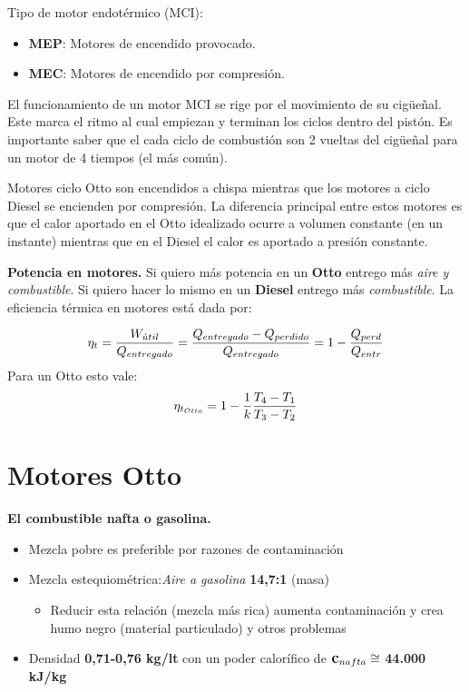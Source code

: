 Tipo de motor endotérmico (MCI):
\begin{itemize}
    \item \textbf{MEP}: Motores de encendido provocado.
    \item \textbf{MEC}: Motores de encendido por compresión.
\end{itemize}

El funcionamiento de un motor MCI se rige por el movimiento de su cigüeñal. Este marca el ritmo al cual empiezan y terminan los ciclos dentro del pistón. Es importante saber que el cada ciclo de combustión son 2 vueltas del cigüeñal para un motor de 4 tiempos (el más común). 

Motores ciclo Otto son encendidos a chispa mientras que los motores a ciclo Diesel se encienden por compresión. La diferencia principal entre estos motores es que el calor aportado en el Otto idealizado ocurre a volumen constante (en un instante) mientras que en el Diesel el calor es aportado a presión constante. 

{\bf Potencia en motores.} Si quiero más potencia en un \textbf{Otto} entrego más \textit{aire y combustible}. Si quiero hacer lo mismo en un \textbf{Diesel} entrego más \textit{combustible}. La eficiencia térmica en motores está dada por:

\[
\eta_t=\frac{W_{\acute{u}til}}{Q_{entregado}}=\frac{Q_{entregado}-Q_{perdido}}{Q_{entregado}}=1-\frac{Q_{perd}}{Q_{entr}}
\]
Para un Otto esto vale:
\[
\eta_{t_{Otto}}=1-\frac{1}{k}\frac{T_4-T_1}{T_3-T_2}
\]
\section{Motores Otto}

\textbf{El combustible nafta o gasolina.} 
\begin{itemize}
    \item Mezcla pobre es preferible por razones de contaminación 
    \item Mezcla estequiométrica:\textit{Aire a gasolina} \textbf{14,7:1} (masa) 
    \begin{itemize}
        \item Reducir esta relación (mezcla más rica) aumenta contaminación y crea humo negro (material particulado) y otros problemas
    \end{itemize}
    \item Densidad \textbf{0,71-0,76 kg/lt} con un poder calorífico de $\mbox{\large$\mathbf{c}$}_{nafta}\cong$ \textbf{44.000 kJ/kg}
\end{itemize}

